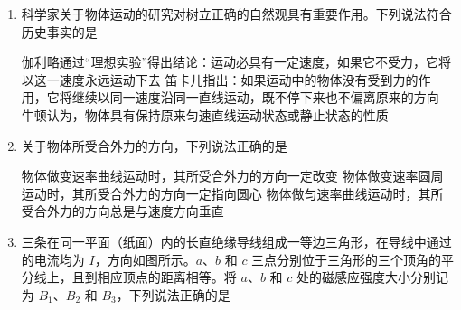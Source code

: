 \documentclass[\gkver]{gaokaozhenti}
\begin{document}
\begin{enumerate}
{棒通过整个圆环所用的时间为 $\sqrt{\frac{2R}{a}}$}
{棒经过环心时流过棒的电流为 $\frac{B\sqrt{2aR}}{\pi r}$}
{棒经过环心时所受安培力的大小为 $\frac{8B^2R\sqrt{2aR}}{\pi r}$}


\item
科学家关于物体运动的研究对树立正确的自然观具有重要作用。下列说法符合历史事实的是

{伽利略通过“理想实验”得出结论：运动必具有一定速度，如果它不受力，它将以这一速度永远运动下去}
{笛卡儿指出：如果运动中的物体没有受到力的作用，它将继续以同一速度沿同一直线运动，既不停下来也不偏离原来的方向}
{牛顿认为，物体具有保持原来匀速直线运动状态或静止状态的性质}


\item
关于物体所受合外力的方向，下列说法正确的是

{物体做变速率曲线运动时，其所受合外力的方向一定改变}
{物体做变速率圆周运动时，其所受合外力的方向一定指向圆心}
{物体做匀速率曲线运动时，其所受合外力的方向总是与速度方向垂直}


\item
三条在同一平面（纸面）内的长直绝缘导线组成一等边三角形，在导线中通过的电流均为 $I$，方向如图所示。$a$、$b$ 和 $c$ 三点分别位于三角形的三个顶角的平分线上，且到相应顶点的距离相等。将 $a$、$b$ 和 $c$ 处的磁感应强度大小分别记为 $B_1$、$B_2$ 和 $B_3$，下列说法正确的是


\end{enumerate}
\end{document}
